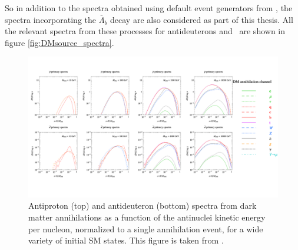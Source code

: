 So in addition to the spectra obtained using default event generators from \cite{Coogan_2017, Ibarra:2012cc}, the spectra incorporating the $\overline{\Lambda}_b$ decay are also considered as part of this thesis. All the relevant spectra from these processes for antideuterons and \ahe\ are shown in figure \ref{fig:DMsource_spectra}. \\ 
\begin{figure}
    \centering
    \includegraphics[width=\textwidth]{figures/cookbook_other_channels.pdf}
		\caption{Antiproton (top) and antideuteron (bottom) spectra from dark matter annihilations as a function of the antinuclei kinetic energy per nucleon, normalized to a single annihilation event, for a wide variety of initial SM states. This figure is taken from \cite{cookbook}.}
    \label{fig:DMsource_spectra_other_channels}
\end{figure}
